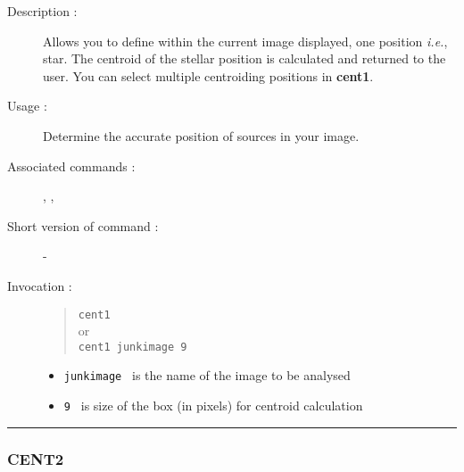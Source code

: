 \begin{description}

\item[Description :] Allows you to define within the current image
displayed, one  position \emph{i.e.}, star.  The centroid of the
stellar position is calculated and returned to the user.  You can
select multiple centroiding positions in {\bf cent1}.

\item[Usage :] Determine the accurate position of sources in your image.
\item[Associated commands :] {\tt {}},
{\tt {}}, {\tt {}}
\item[Short version of command :] -
\item[Invocation :]

\begin{quote}{\tt  cent1 }\\
or \\
{\tt cent1 junkimage 9 }
\end{quote}

\begin{itemize}

\item {\tt junkimage } is the name of the image to be analysed
\item {\tt 9 } is size of the box (in pixels) for centroid calculation

\end{itemize}

\end{description}

\hrule
\subsubsection*{\label{CENT2}CENT2}

